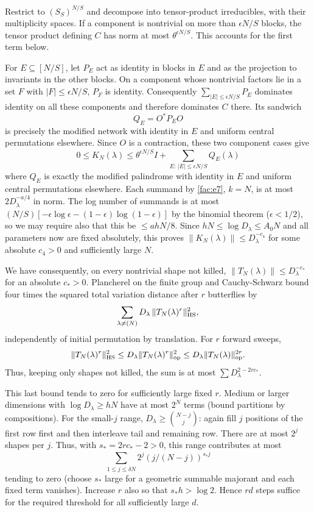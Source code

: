 Restrict to $(S_S)^{N/S}$ and decompose into tensor-product irreducibles,
with their multiplicity spaces. If a component is nontrivial on more
than $\epsilon N/S$ blocks, the tensor product defining $C$ has norm at
most $\theta^{\epsilon N/S}$. This accounts for the first term below.

For $E\subseteq[N/S]$, let $P_E$ act as identity in blocks in $E$ and
as the projection to invariants in the other blocks. On a component
whose nontrivial factors lie in a set $F$ with $|F|\le\epsilon N/S$,
$P_F$ is identity. Consequently $\sum_{|E|\le\epsilon N/S}P_E$
dominates identity on all these components and therefore dominates
$C$ there. Its sandwich
\[
 Q_E=O^*P_EO
\]
is precisely the modified network with identity in $E$ and uniform
central permutations elsewhere. Since $O$ is a contraction, these two
component cases give
\[
0\le K_N(\lambda)\le \theta^{\epsilon N/S} I+\sum_{E:\, |E|\le\epsilon N/S}Q_E(\lambda)
\]
where $Q_E$ is exactly the modified palindrome with identity in $E$ and uniform central permutations elsewhere. Each summand by \eqref{fac:e7}, $k=N$, is at most $2D_\lambda^{-a/4}$ in norm. The log number of summands is at most $(N/S)[-\epsilon\log\epsilon-(1-\epsilon)\log(1-\epsilon)]$ by the binomial theorem ($\epsilon<1/2$), so we may require also that this be $\le ah N/8$. Since $hN\le\log D_\lambda\le A_0 N$ and all parameters now are fixed absolutely, this proves $\|K_N(\lambda)\|\le D_\lambda^{-c_4}$ for some absolute $c_4>0$ and sufficiently large $N$.

We have consequently, on every nontrivial shape not killed, $\|T_N(\lambda)\|\le D_\lambda^{-c_*}$ for an absolute $c_*>0$. Plancherel on the finite group and Cauchy-Schwarz bound four times the squared total variation distance after $r$ butterflies by
\[
\sum_{\lambda\ne (N)} D_\lambda\,\|T_N(\lambda)^r\|_{\rm HS}^2,
\]
independently of initial permutation by translation. For $r$ forward sweeps,
\[
 \|T_N(\lambda)^r\|_{\mathrm{HS}}^2
 \le D_\lambda\|T_N(\lambda)^r\|_{\mathrm{op}}^2
 \le D_\lambda\|T_N(\lambda)\|_{\mathrm{op}}^{2r}.
\]
Thus, keeping only shapes not killed, the sum is at most
$\sum D_\lambda^{2-2rc_*}$.

This last bound tends to zero for sufficiently large fixed $r$. Medium or larger dimensions with $\log D_\lambda\ge hN$ have at most $2^N$ terms (bound partitions by compositions). For the small-$j$ range, $D_\lambda\ge \binom{N-j}{j}$: again fill $j$ positions of the first row first and then interleave tail and remaining row. There are at most $2^j$ shapes per $j$. Thus, with $s_*=2r c_*-2>0$, this range contributes at most
\[
\sum_{1\le j\le\delta N}2^j(j/(N-j))^{s_*j}
\]
tending to zero (choose $s_*$ large for a geometric summable majorant and each fixed term vanishes). Increase $r$ also so that $s_* h>\log 2$. Hence $rd$ steps suffice for the required threshold for all sufficiently large $d$.

